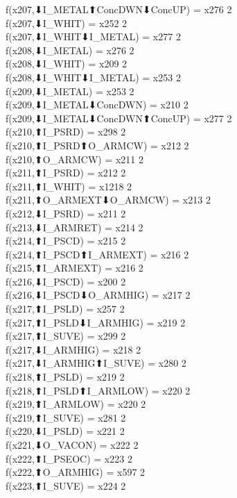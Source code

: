 f(x207,⬇I_METAL⬆ConcDWN⬇ConcUP) = x276 {2} \\
f(x207,⬇I_WHIT) = x252 {2} \\
f(x207,⬇I_WHIT⬇I_METAL) = x277 {2} \\
f(x208,⬇I_METAL) = x276 {2} \\
f(x208,⬇I_WHIT) = x209 {2} \\
f(x208,⬇I_WHIT⬇I_METAL) = x253 {2} \\
f(x209,⬇I_METAL) = x253 {2} \\
f(x209,⬇I_METAL⬇ConcDWN) = x210 {2} \\
f(x209,⬇I_METAL⬇ConcDWN⬆ConcUP) = x277 {2} \\
f(x210,⬆I_PSRD) = x298 {2} \\
f(x210,⬆I_PSRD⬆O_ARMCW) = x212 {2} \\
f(x210,⬆O_ARMCW) = x211 {2} \\
f(x211,⬆I_PSRD) = x212 {2} \\
f(x211,⬆I_WHIT) = x1218 {2} \\
f(x211,⬆O_ARMEXT⬇O_ARMCW) = x213 {2} \\
f(x212,⬇I_PSRD) = x211 {2} \\
f(x213,⬇I_ARMRET) = x214 {2} \\
f(x214,⬆I_PSCD) = x215 {2} \\
f(x214,⬆I_PSCD⬆I_ARMEXT) = x216 {2} \\
f(x215,⬆I_ARMEXT) = x216 {2} \\
f(x216,⬇I_PSCD) = x200 {2} \\
f(x216,⬇I_PSCD⬇O_ARMHIG) = x217 {2} \\
f(x217,⬆I_PSLD) = x257 {2} \\
f(x217,⬆I_PSLD⬇I_ARMHIG) = x219 {2} \\
f(x217,⬆I_SUVE) = x299 {2} \\
f(x217,⬇I_ARMHIG) = x218 {2} \\
f(x217,⬇I_ARMHIG⬆I_SUVE) = x280 {2} \\
f(x218,⬆I_PSLD) = x219 {2} \\
f(x218,⬆I_PSLD⬆I_ARMLOW) = x220 {2} \\
f(x219,⬆I_ARMLOW) = x220 {2} \\
f(x219,⬆I_SUVE) = x281 {2} \\
f(x220,⬇I_PSLD) = x221 {2} \\
f(x221,⬇O_VACON) = x222 {2} \\
f(x222,⬆I_PSEOC) = x223 {2} \\
f(x222,⬆O_ARMHIG) = x597 {2} \\
f(x223,⬆I_SUVE) = x224 {2} \\
